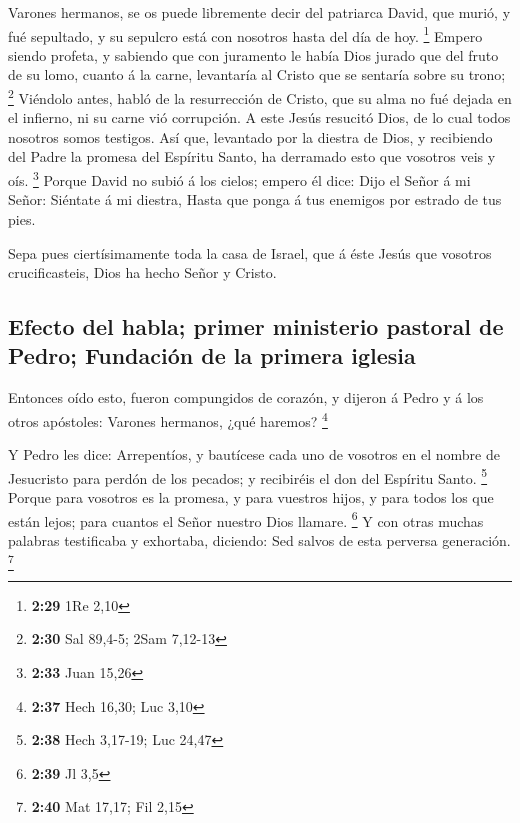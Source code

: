  Varones hermanos, se os puede libremente decir del
patriarca David, que murió, y fué sepultado, y su sepulcro está con
nosotros hasta del día de hoy. \footnote{\textbf{2:29} 1Re 2,10}
 Empero siendo profeta, y sabiendo que con juramento le
había Dios jurado que del fruto de su lomo, cuanto á la carne,
levantaría al Cristo que se sentaría sobre su trono; \footnote{\textbf{2:30}
  Sal 89,4-5; 2Sam 7,12-13}  Viéndolo antes, habló de la
resurrección de Cristo, que su alma no fué dejada en el infierno, ni su
carne vió corrupción.  A este Jesús resucitó Dios, de lo
cual todos nosotros somos testigos.  Así que, levantado
por la diestra de Dios, y recibiendo del Padre la promesa del Espíritu
Santo, ha derramado esto que vosotros veis y oís. \footnote{\textbf{2:33}
  Juan 15,26}  Porque David no subió á los cielos; empero
él dice: Dijo el Señor á mi Señor: Siéntate á mi diestra,
 Hasta que ponga á tus enemigos por estrado de tus pies.

 Sepa pues ciertísimamente toda la casa de Israel, que á
éste Jesús que vosotros crucificasteis, Dios ha hecho Señor y Cristo.

\hypertarget{efecto-del-habla-primer-ministerio-pastoral-de-pedro-fundaciuxf3n-de-la-primera-iglesia}{%
\subsection{Efecto del habla; primer ministerio pastoral de Pedro;
Fundación de la primera
iglesia}\label{efecto-del-habla-primer-ministerio-pastoral-de-pedro-fundaciuxf3n-de-la-primera-iglesia}}

 Entonces oído esto, fueron compungidos de corazón, y
dijeron á Pedro y á los otros apóstoles: Varones hermanos, ¿qué haremos?
\footnote{\textbf{2:37} Hech 16,30; Luc 3,10}

 Y Pedro les dice: Arrepentíos, y bautícese cada uno de
vosotros en el nombre de Jesucristo para perdón de los pecados; y
recibiréis el don del Espíritu Santo. \footnote{\textbf{2:38} Hech
  3,17-19; Luc 24,47}  Porque para vosotros es la
promesa, y para vuestros hijos, y para todos los que están lejos; para
cuantos el Señor nuestro Dios llamare. \footnote{\textbf{2:39} Jl 3,5}
 Y con otras muchas palabras testificaba y exhortaba,
diciendo: Sed salvos de esta perversa generación. \footnote{\textbf{2:40}
  Mat 17,17; Fil 2,15}

